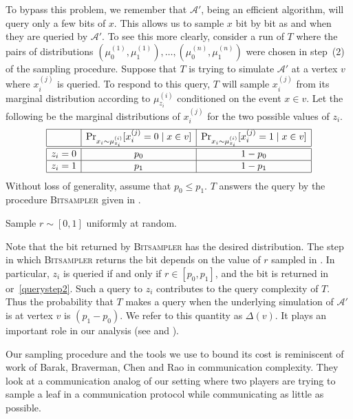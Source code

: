 \documentclass{toc}
\begin{document}
To bypass this problem, we remember that $\mathcal{A}'$, being an efficient algorithm, will query only a few bits of $x$. This allows us to sample $x$ bit by bit as and when they are queried by $\mathcal{A}'$.
To see this more clearly, consider a run of $T$ where the pairs of distributions $(\mu_0^{(1)}, \mu_1^{(1)}), \ldots, (\mu_0^{(n)}, \mu_1^{(n)})$ were chosen in step~(2) of the sampling procedure.  
Suppose that $T$ is trying to simulate $\mathcal{A'}$ at a vertex $v$ where $x_i^{(j)}$ is queried.  To respond to this query, $T$ will sample $x_i^{(j)}$ from its marginal distribution according to $\mu_{z_i}^{(i)}$ conditioned on the 
event $x \in v$. Let the following be the marginal distributions of $x_i^{(j)}$ for the two possible values of $z_i$.
\[\begin{array}{|c|c|c|}
\hline
& \Pr_{x_i \sim \mu_{z_i}^{(i)}} [x_i^{(j)}=0 \mid x \in v]&\Pr_{x_i \sim \mu_{z_i}^{(i)}} [x_i^{(j)}=1 \mid x \in v] \\
\hline \hline
z_i=0 & p_0 & 1-p_0 \\
\hline
z_i=1& p_1 & 1-p_1 \\
\hline
\end{array}
\]
Without loss of generality, assume that $p_0 \leq p_1$. $T$ answers the query by the procedure \textsc{Bitsampler} given in .
\begin{algorithm}[!h]
\DontPrintSemicolon
\caption{ \textsc{Bitsampler} (suppose $p_0 \leq p_1$)}
\label{samplepr}
Sample $r \sim [0,1]$ uniformly at random.\label{pickr} \;
 \;
\;
\end{algorithm}
Note that the bit returned by \textsc{Bitsampler} has the desired distribution. The step in which \textsc{Bitsampler} returns the bit depends on the value of $r$ sampled in . In particular, $z_i$ is queried if and only if $r \in [p_0,p_1]$, and the bit is returned in  or~\ref{querystep2}. Such a query to $z_i$ contributes to the query complexity of $T$. Thus the probability that $T$ makes a query when the underlying simulation of $\mathcal{A}'$ is at vertex $v$ is $(p_1-p_0)$. We refer to this quantity as $\Delta(v)$. It plays an important role in our analysis (see  and ).

Our sampling procedure and the tools we use to bound its cost is reminiscent of work of Barak, Braverman, Chen and Rao \cite{DBLP:journals/siamcomp/BarakBCR13} in communication complexity.  
They look at a communication analog of our setting where two players are trying to sample a leaf in a communication protocol while communicating as little as possible.  
\end{document}
